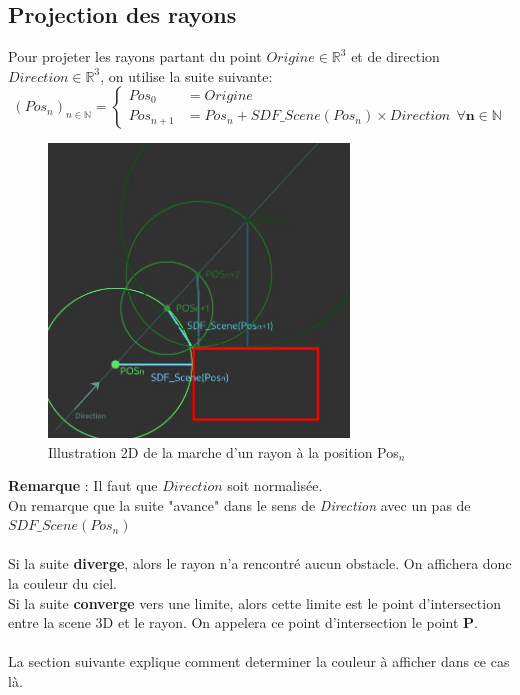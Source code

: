 \newpage
\subsection{Projection des rayons}
\label{subsec:projection}
Pour projeter les rayons partant du point $Origine\in \mathbb{R}^3$ et de direction $Direction\in \mathbb{R}^3$, on utilise la suite suivante:
$$
(Pos_n)_{n\in \mathbb{N}}=\left\{
    \begin{array}{ll}
        Pos_0 &= Origine \\
        Pos_{n+1} &= Pos_n + SDF\_Scene(Pos_n)\times Direction \ \ \mathbf{\forall n\in \mathbb{N}}
    \end{array}
\right.
$$

\begin{figure}[h]
    \centering
    \includegraphics[width=8cm]{images/ProjectionDesRayons.jpg}
    \caption{Illustration 2D de la marche d'un rayon à la position Pos$_n$ }
    \label{fig:my_label}
\end{figure}

\textbf{Remarque} : Il faut que $Direction$ soit normalisée. \\
On remarque que la suite "avance" dans le sens de \emph{Direction} avec un pas de $SDF\_Scene(Pos_n)$\\
\\
Si la suite \textbf{diverge}, alors le rayon n'a rencontré aucun obstacle. On affichera donc la couleur du ciel.\\
Si la suite \textbf{converge} vers une limite, alors cette limite est le point d'intersection entre la scene 3D et le rayon. On appelera ce point d'intersection le point \textbf{P}.\\
\\
La section suivante explique comment determiner la couleur à afficher dans ce cas là.